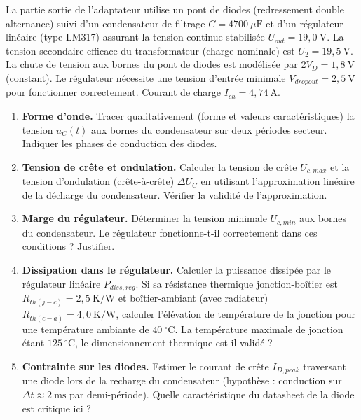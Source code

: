\documentclass[11pt]{article}
\begin{document}
\begin{exercice}
La partie sortie de l'adaptateur utilise un pont de diodes (redressement double alternance) suivi d'un condensateur de filtrage $C = 4700~\mu\mathrm{F}$ et d'un régulateur linéaire (type LM317) assurant la tension continue stabilisée $U_{out} = 19,0~\mathrm{V}$. La tension secondaire efficace du transformateur (charge nominale) est $U_2 = 19,5~\mathrm{V}$. La chute de tension aux bornes du pont de diodes est modélisée par $2V_D = 1,8~\mathrm{V}$ (constant). Le régulateur nécessite une tension d'entrée minimale $V_{dropout} = 2,5~\mathrm{V}$ pour fonctionner correctement. Courant de charge $I_{ch} = 4,74~\mathrm{A}$.
\begin{enumerate}
    \item \textbf{Forme d'onde.} Tracer qualitativement (forme et valeurs caractéristiques) la tension $u_C(t)$ aux bornes du condensateur sur deux périodes secteur. Indiquer les phases de conduction des diodes.
    \item \textbf{Tension de crête et ondulation.} Calculer la tension de crête $U_{c,max}$ et la tension d'ondulation (crête-à-crête) $\Delta U_C$ en utilisant l'approximation linéaire de la décharge du condensateur. Vérifier la validité de l'approximation.
    \item \textbf{Marge du régulateur.} Déterminer la tension minimale $U_{c,min}$ aux bornes du condensateur. Le régulateur fonctionne-t-il correctement dans ces conditions ? Justifier.
    \item \textbf{Dissipation dans le régulateur.} Calculer la puissance dissipée par le régulateur linéaire $P_{diss, reg}$. Si sa résistance thermique jonction-boîtier est $R_{th(j-c)} = 2,5~\mathrm{K/W}$ et boîtier-ambiant (avec radiateur) $R_{th(c-a)} = 4,0~\mathrm{K/W}$, calculer l'élévation de température de la jonction pour une température ambiante de $40~^\circ\mathrm{C}$. La température maximale de jonction étant $125~^\circ\mathrm{C}$, le dimensionnement thermique est-il validé ?
    \item \textbf{Contrainte sur les diodes.} Estimer le courant de crête $I_{D,peak}$ traversant une diode lors de la recharge du condensateur (hypothèse : conduction sur $\Delta t \approx 2~\mathrm{ms}$ par demi-période). Quelle caractéristique du datasheet de la diode est critique ici ?
\end{enumerate}
\end{exercice}
\end{document}
